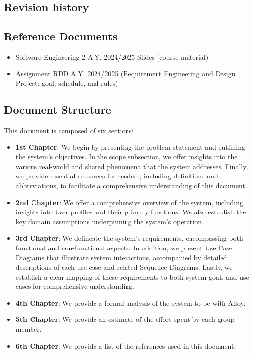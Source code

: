 \documentclass{article}
\begin{document}
\subsection{Revision history}
\subsection{Reference Documents}
    \begin{itemize}
        \item Software Engineering 2 A.Y. 2024/2025 Slides (course material)
        \item Assignment RDD A.Y. 2024/2025 (Requirement Engineering and Design Project: goal, schedule, and rules)
    \end{itemize}

\subsection{Document Structure}
    This document is composed of six sections:

\begin{itemize}
    \item \textbf{1st Chapter}: We begin by presenting the problem statement and outlining the system's objectives. In the scope subsection, we offer insights into the various real-world and shared phenomena that the system addresses. Finally, we provide essential resources for readers, including definitions and abbreviations, to facilitate a comprehensive understanding of this document.
    
    \item \textbf{2nd Chapter}: We offer a comprehensive overview of the system, including insights into User profiles and their primary functions. We also establish the key domain assumptions underpinning the system's operation.
    
    \item \textbf{3rd Chapter}: We delineate the system's requirements, encompassing both functional and non-functional aspects. In addition, we present Use Case Diagrams that illustrate system interactions, accompanied by detailed descriptions of each use case and related Sequence Diagrams. Lastly, we establish a clear mapping of these requirements to both system goals and use cases for comprehensive understanding.
    
    \item \textbf{4th Chapter}: We provide a formal analysis of the system to be with Alloy.
    
    \item \textbf{5th Chapter}: We provide an estimate of the effort spent by each group member.
    
    \item \textbf{6th Chapter}: We provide a list of the references used in this document.
\end{itemize}
\end{document}
